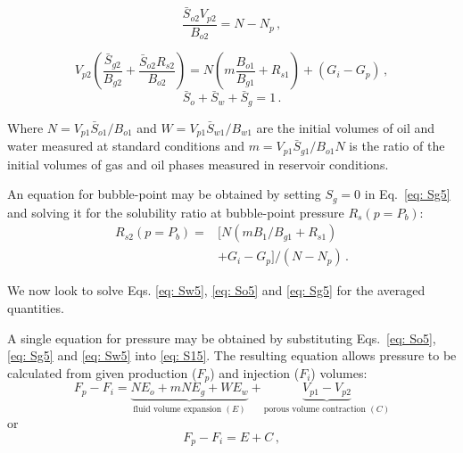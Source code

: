 \documentclass[authoryear,preprint,review,12pt]{elsarticle}
\begin{document}
\begin{equation}\label{eq: So5}
\frac{\bar{S}_{o2} V_{p2}}{B_{o2}} = N-N_p \, ,
\end{equation}

\begin{equation}\label{eq: Sg5}
V_{p2}\left(\frac{\bar{S}_{g2}}{B_{g2}} +\frac{\bar{S}_{o2} R_{s2}}{B_{o2}}\right) = N\left(m\frac{B_{o1}}{B_{g1}} + R_{s1}\right) +\left(G_i-G_p\right) \, ,
\end{equation}
%
\begin{equation}\label{eq: S15}
\bar{S}_o+\bar{S}_w+\bar{S}_g=1 \, .
\end{equation}

Where $N=V_{p1} \bar{S}_{o1}/B_{o1}$ and $W=V_{p1} \bar{S}_{w1}/B_{w1}$ are the initial volumes of oil and water measured at standard conditions and $m=V_{p1} \bar{S}_{g1}/B_{o1} N$ is the ratio of the initial volumes of gas and oil phases measured in reservoir conditions.

An equation for bubble-point may be obtained by setting $S_g=0$ in Eq.~\eqref{eq: Sg5} and solving it for the solubility ratio at bubble-point pressure $R_s(p=P_b)$:
\begin{equation}
\begin{split}
R_{s2}\left(p=P_b\right) = &\Big[N\left(m B_{1}/B_{g1} +R_{s1}\right)\\
&+G_i-G_p\Big]/\left(N-N_p\right) \, .
\end{split}
\end{equation}


We now look to solve Eqs. \eqref{eq: Sw5}, \eqref{eq: So5} and \eqref{eq: Sg5} for the averaged quantities. 


A single equation for pressure may be obtained by substituting Eqs.~\eqref{eq: So5}, \eqref{eq: Sg5} and \eqref{eq: Sw5} into \eqref{eq: S15}. The resulting equation allows pressure to be calculated from given production ($F_p$) and injection ($F_i$) volumes:
\begin{equation}\label{eq: MBE}
F_p - F_i= \underbrace{N E_o + mN E_g + W E_w}_{\text{fluid volume expansion } (E)} +\underbrace{V_{p1}-V_{p2}}_{\text{porous volume contraction } (C)}
\end{equation}
or
\begin{equation}\label{eq: MBE_short}
F_p - F_i= E + C \, ,
\end{equation}
\end{document}

